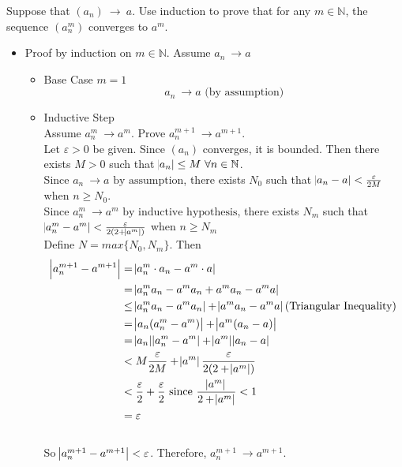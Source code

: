 \documentclass[]{exam}
\begin{document}
\begin{questions}
\question Suppose that $(a_n)\ \rightarrow\ a$. Use induction to prove that for any $m\in\mathbb{N}$, the sequence $(a_n^m)$ converges to $a^m$.
	\begin{itemize}
		\item Proof by induction on $m\in\mathbb{N}$. Assume $a_n\ \rightarrow a$
		\begin{itemize}
			\item Base Case $m = 1$
			\begin{equation*}
			a_n\ \rightarrow a\text{ (by assumption)}
			\end{equation*}
			\item Inductive Step
			\\ Assume $a_n^m\ \rightarrow a^m$. Prove $a_n^{m+1}\ \rightarrow a^{m+1}$.
			\\ Let $\varepsilon > 0$ be given. Since $(a_n)$ converges, it is bounded. Then there exists $M > 0$ such that $\abs{a_n} \leq M\ \forall n\in\mathbb{N}$.
			\\ Since $a_n\ \rightarrow a\text{ by assumption}$, there exists $N_0$ such that $\abs{a_n - a} < \frac{\varepsilon}{2M}$ when $n\geq N_0$.
			\\ Since $a_n^m\ \rightarrow a^m\text{ by inductive hypothesis}$, there exists $N_m$ such that $\abs{a_n^m - a^m} < \frac{\varepsilon}{2(2 + \abs{a^m})}$ when $n\geq N_m$
			\\ Define $N = max\{N_0, N_m\}$. Then
			\begin{align*}
			\abs{a_n^{m+1} - a^{m+1}}	&=\abs{a_n^m\cdot a_n - a^m\cdot a}\\
										&=\abs{a_n^m a_n -a^m a_n + a^m a_n - a^m a}\\
										&\leq \abs{a_n^m a_n -a^m a_n} + \abs{a^m a_n - a^m a}\text{(Triangular Inequality)}\\
										&=\abs{a_n(a_n^m - a^m)} + \abs{a^m(a_n - a)}\\
										&=\abs{a_n}\abs{a_n^m - a^m} + \abs{a^m}\abs{a_n - a}\\
										&<M\frac{\varepsilon}{2M} + \abs{a^m}\frac{\varepsilon}{2(2 + \abs{a^m})}\\
										&< \frac{\varepsilon}{2} + \frac{\varepsilon}{2}\text{ since }\frac{\abs{a^m}}{2 + \abs{a^m}} < 1\\
										&= \varepsilon
			\end{align*}
			\\ So $\abs{a_n^{m+1} - a^{m+1}} < \varepsilon$. Therefore, $a_n^{m+1}\ \rightarrow a^{m+1}$.
		\end{itemize}
	\end{itemize}
\end{questions}
\end{document}
